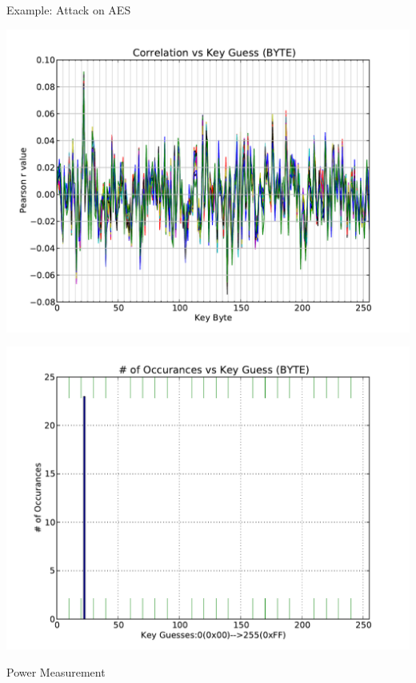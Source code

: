 \documentclass[xcolor=pdftex,dvipsnames,table,final]{beamer}
\begin{document}
\begin{frame}[fragile]{}
\begin{columns}[t]
\begin{column}{.31\linewidth}
\begin{block}{Example: Attack on AES}
        \begin{minipage}[t]{0.49\linewidth}
           \includegraphics[width=1.0\linewidth]{../figures/pearsonsCoActual}
        \end{minipage}%
        \begin{minipage}[t]{0.49\linewidth}  
		\includegraphics[width=1.0\linewidth]{../figures/histPearsonsCoActual}
        \end{minipage}
        \vspace{-3.8ex}
       \end{block}
       \begin{block}{Power Measurement}
        \begin{minipage}{0.45\linewidth}

\end{minipage}
\end{block}
\end{column}
\end{columns}
\end{frame}
\end{document}
